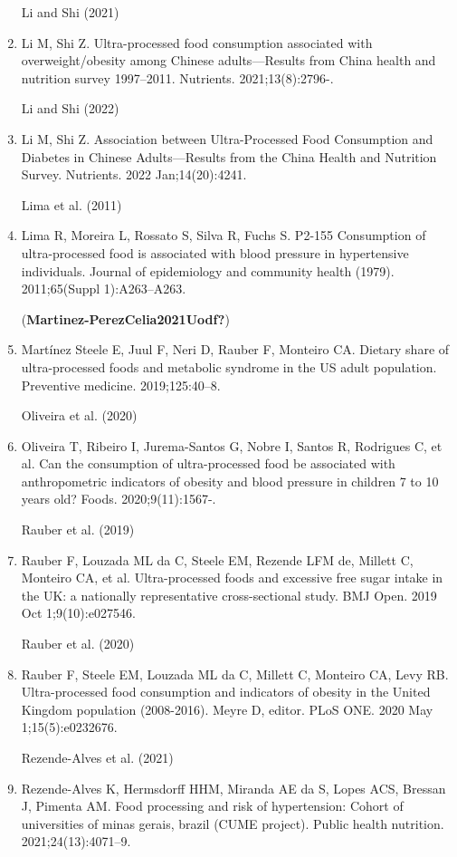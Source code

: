 \documentclass[
]{article}
\begin{document}
\begin{enumerate}
  Li and Shi (2021)
\item
  Li M, Shi Z. Ultra-processed food consumption associated with
  overweight/obesity among Chinese adults---Results from China health
  and nutrition survey 1997--2011. Nutrients. 2021;13(8):2796-.

  Li and Shi (2022)
\item
  Li M, Shi Z. Association between Ultra-Processed Food Consumption and
  Diabetes in Chinese Adults---Results from the China Health and
  Nutrition Survey. Nutrients. 2022 Jan;14(20):4241.

  Lima et al. (2011)
\item
  Lima R, Moreira L, Rossato S, Silva R, Fuchs S. P2-155 Consumption of
  ultra-processed food is associated with blood pressure in hypertensive
  individuals. Journal of epidemiology and community health (1979).
  2011;65(Suppl 1):A263--A263.

  (\textbf{Martinez-PerezCelia2021Uodf?})
\item
  Martínez Steele E, Juul F, Neri D, Rauber F, Monteiro CA. Dietary
  share of ultra-processed foods and metabolic syndrome in the US adult
  population. Preventive medicine. 2019;125:40--8.

  Oliveira et al. (2020)
\item
  Oliveira T, Ribeiro I, Jurema-Santos G, Nobre I, Santos R, Rodrigues
  C, et al. Can the consumption of ultra-processed food be associated
  with anthropometric indicators of obesity and blood pressure in
  children 7 to 10 years old? Foods. 2020;9(11):1567-.

  Rauber et al. (2019)
\item
  Rauber F, Louzada ML da C, Steele EM, Rezende LFM de, Millett C,
  Monteiro CA, et al. Ultra-processed foods and excessive free sugar
  intake in the UK: a nationally representative cross-sectional study.
  BMJ Open. 2019 Oct 1;9(10):e027546.

  Rauber et al. (2020)
\item
  Rauber F, Steele EM, Louzada ML da C, Millett C, Monteiro CA, Levy RB.
  Ultra-processed food consumption and indicators of obesity in the
  United Kingdom population (2008-2016). Meyre D, editor. PLoS ONE. 2020
  May 1;15(5):e0232676.

  Rezende-Alves et al. (2021)
\item
  Rezende-Alves K, Hermsdorff HHM, Miranda AE da S, Lopes ACS, Bressan
  J, Pimenta AM. Food processing and risk of hypertension: Cohort of
  universities of minas gerais, brazil (CUME project). Public health
  nutrition. 2021;24(13):4071--9.


\end{enumerate}
\end{document}
